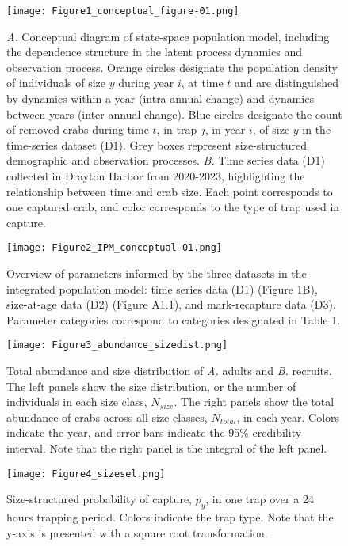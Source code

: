 \documentclass{article}
\begin{document}
\begin{figure}[H]
    \centering
    \texttt{[image: Figure1\_conceptual\_figure-01.png]}
    \caption{\textit{A.} Conceptual diagram of state-space population model, including the dependence structure in the latent process dynamics and observation process. Orange circles designate the population density of individuals of size $y$ during year $i$, at time $t$ and are distinguished by dynamics within a year (intra-annual change) and dynamics between years (inter-annual change). Blue circles designate the count of removed crabs during time $t$, in trap $j$, in year $i$, of size $y$ in the time-series dataset (D1). Grey boxes represent size-structured demographic and observation processes. \textit{B.} Time series data (D1) collected in Drayton Harbor from 2020-2023, highlighting the relationship between time and crab size. Each point corresponds to one captured crab, and color corresponds to the type of trap used in capture.}
\end{figure}

\begin{figure}[H]
    \centering
    \texttt{[image: Figure2\_IPM\_conceptual-01.png]}
    \caption{Overview of parameters informed by the three datasets in the integrated population model: time series data (D1) (Figure 1B), size-at-age data (D2) (Figure A1.1), and mark-recapture data (D3). Parameter categories correspond to categories designated in Table 1.}
\end{figure}

\begin{figure}[H]
    \centering
    \texttt{[image: Figure3\_abundance\_sizedist.png]}
    \caption{Total abundance and size distribution of \textit{A.} adults and \textit{B.} recruits. The left panels show the size distribution, or the number of individuals in each size class, $N_{size}$. The right panels show the total abundance of crabs across all size classes, $N_{total}$, in each year. Colors indicate the year, and error bars indicate the 95\% credibility interval. Note that the right panel is the integral of the left panel.}
\end{figure}

\begin{figure}[H]
    \centering
    \texttt{[image: Figure4\_sizesel.png]}
    \caption{Size-structured probability of capture, $p_{y}$, in one trap over a 24 hours trapping period. Colors indicate the trap type. Note that the y-axis is presented with a square root transformation.}
\end{figure}
\end{document}
